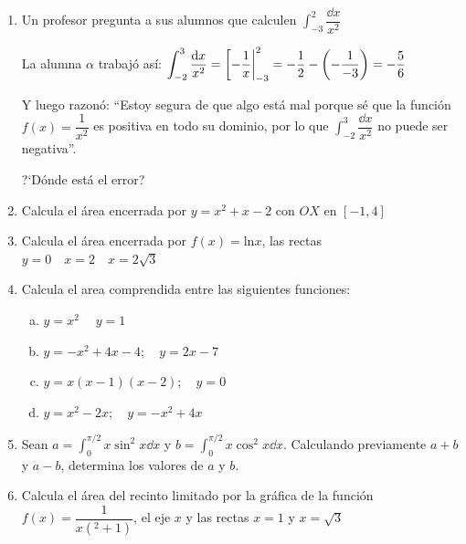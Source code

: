 \begin{enumerate}
\item Un profesor pregunta a sus alumnos que calculen $\displaystyle \int_{-3}^2 \dfrac {\dd x}{x^2}$

La alumna $\alpha$ trabajó así: 
$\displaystyle \int_{-2}^3 \dfrac {\dd x}{x^2}= \eval[-\dfrac 1 x|_{-3}^2=-\frac 1 2 -\left(-  \frac 1 {-3} \right)=-\frac 5 6$

Y luego razonó: ``Estoy segura de que algo está mal porque sé que la función $f(x)=\dfrac 1 {x^2} $ es positiva  en todo su dominio, por lo que $\displaystyle \int_{-2}^3 \dfrac {\dd x}{x^2}$ no puede ser negativa''.

?`Dónde está el error?



\item Calcula el área encerrada por $y=x^2+x-2$ con $OX$ en $[-1,4]$

\rightline{\textcolor{gris}{Sol: $\; 155/6 \; u^2$}}


\item Calcula el área encerrada por $f(x)=\mathrm{ln} x$, las rectas $y=0 \quad x=2\quad x=2\sqrt{3}$


\item Calcula el area comprendida entre las siguientes funciones: 
\begin{multicols}{2}
\begin{enumerate} [a) ]
\item $y=x^2 \; \quad y=1$
\item $y=-x^2+4x-4; \quad y=2x-7$
\item $y=x(x-1)(x-2); \quad y=0$
\item $y=x^2-2x; \quad y=-x^2+4x$
\end{enumerate}	
\end{multicols}
\rightline{\textcolor{gris}{Sol: $a)	\; 1/2 \; u^2 \quad b) \; 32/2 \; u^2 ; \quad c)\; 1/2 \; u^2; \quad d)\; 9 \; u^2$}}
\item Sean $a=\displaystyle \int_0^{\pi/2} x \sin^2 x \dd x$ y $b=\displaystyle \int_0^{\pi/2} x \cos^2 x \dd x$. Calculando previamente $a+b$ y $a-b$, determina los valores de $a$ y $b$.
 

 
 \item Calcula el área del recinto limitado por la gráfica de la función $f(x)=\dfrac {1}{x(^2+1) }$, el eje $x$ y las rectas $x=1$ y $x=\sqrt{3}$
  

\end{enumerate}
